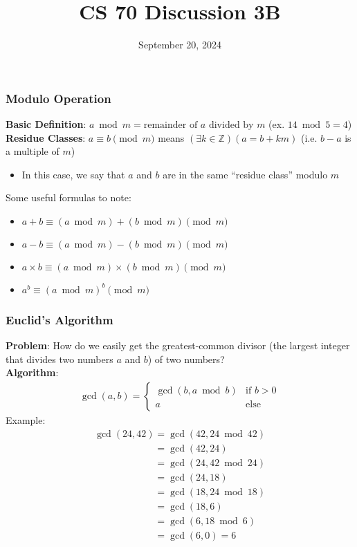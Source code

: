 \documentclass{beamer}
\title{CS 70 Discussion 3B}
\date{September 20, 2024}
\begin{document}
\frame{\titlepage}

\begin{frame}
    \frametitle{Modulo Operation}
    {\bf Basic Definition}: $a\bmod m=\text{remainder of }a\text{ divided by }m$ (ex. $14\bmod 5=4$)\\
    {\bf Residue Classes}: $a\equiv b\pmod m$ means $(\exists k\in\mathbb{Z})(a=b+km)$ (i.e. $b-a$ is a multiple of $m$)
    \begin{itemize}
        \item In this case, we say that $a$ and $b$ are in the same ``residue class'' modulo $m$
    \end{itemize}
    Some useful formulas to note:
    \begin{itemize}
        \item $a+b\equiv (a\bmod m)+(b\bmod m)\pmod m$
        \item $a-b\equiv (a\bmod m)-(b\bmod m)\pmod m$
        \item $a\times b\equiv (a\bmod m)\times (b\bmod m)\pmod m$
        \item $a^b\equiv (a\bmod m)^b\pmod m$
    \end{itemize}
\end{frame}

\begin{frame}
    \frametitle{Euclid's Algorithm}
    {\bf Problem}: How do we easily get the greatest-common divisor (the largest integer that divides two numbers $a$ and $b$) of two numbers?\\
    {\bf Algorithm}:
    \begin{gather*}
    \gcd(a,b)=\begin{cases}\gcd(b,a\bmod b)&\text{if }b>0\\a&\text{else}\end{cases}
    \end{gather*}
    Example:
    \begin{align*}
    &\gcd(24,42)=\gcd(42,24\bmod 42)&\\
    &\phantom{\gcd(24,42)}=\gcd(42,24)&\\
    &\phantom{\gcd(24,42)}=\gcd(24,42\bmod 24)&\\
    &\phantom{\gcd(24,42)}=\gcd(24,18)&\\
    &\phantom{\gcd(24,42)}=\gcd(18,24\bmod 18)&\\
    &\phantom{\gcd(24,42)}=\gcd(18,6)&\\
    &\phantom{\gcd(24,42)}=\gcd(6,18\bmod 6)&\\
    &\phantom{\gcd(24,42)}=\gcd(6,0)=6&
    \end{align*}
\end{frame}
\end{document}
